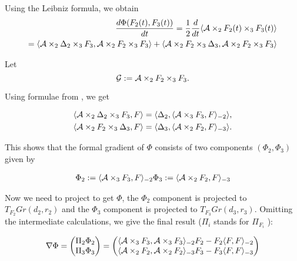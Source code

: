 
Using the Leibniz formula, we obtain
\begin{eqnarray}
\frac{d\Phi(F_2(t), F_3(t))} {dt} = \frac{1}{2} \frac{d}{dt} \langle \mathcal{A} \times_2 F_2(t) \times_3 F_3(t) \rangle  \\
= \langle \mathcal{A} \times_2 \Delta_2 \times_3 F_3, \mathcal{A} \times_2 F_2 \times_3 F_3 \rangle +  \langle \mathcal{A} \times_2 F_2 \times_3 \Delta_3 , \mathcal{A} \times_2 F_2 \times_3 F_3 \rangle 
\end{eqnarray}

Let
\begin{equation}
\mathcal{G}:= \mathcal{A} \times_2 {F_2} \times_3 {F_3}.
\end{equation}

Using formulae from \cite{elden_savas_2009}, we get

\begin{eqnarray}
\langle \mathcal{A} \times_2 \Delta{_2} \times_3 {F_3}, F \rangle = \langle \Delta{_2}, \langle  \mathcal{A} \times_3 {F_3}, F \rangle _{-2} \rangle, \\
\langle \mathcal{A} \times_2 {F_2} \times_3 \Delta{_3}, F \rangle = \langle \Delta{_3}, \langle  \mathcal{A} \times_2 {F_2}, F \rangle _{-3} \rangle.
\end{eqnarray}

This shows that the formal gradient of $\Phi$ consists of two components $(\Phi_2, \Phi_3)$
given by

\begin{eqnarray}
\Phi{_2} := \langle  \mathcal{A} \times_3 {F_3}, F \rangle _{-2}
\Phi{_3} := \langle  \mathcal{A} \times_2 {F_2}, F \rangle _{-3}
\end{eqnarray}

Now we need to project to get $\Phi$, the $\Phi_2$ component is projected to $T_{F_2}Gr(d_2, r_2)$ and
the $\Phi_3$ component is projected to $T_{F_3}Gr(d_3, r_3)$. Omitting the intermediate calculations,
we give the final result ($\Pi_i$ stands for $\Pi_{F_i}$ ):

\begin{equation}
\nabla \Phi = 
\begin{pmatrix}
\Pi{_2} \Phi{_2} \\
\Pi{_3} \Phi{_3}
\end{pmatrix} 
=
\begin{pmatrix}
\langle \mathcal{A} \times_3 {F_3}, \mathcal{A} \times_3 {F_3} \rangle_{-2}{F_2} - {F_2} \langle F, F \rangle_{-2} \\
\langle \mathcal{A} \times_2 {F_2}, \mathcal{A} \times_2 {F_2} \rangle_{-3} {F_3} - {F_3} \langle F, F \rangle_{-3}
\end{pmatrix}
\end{equation}

